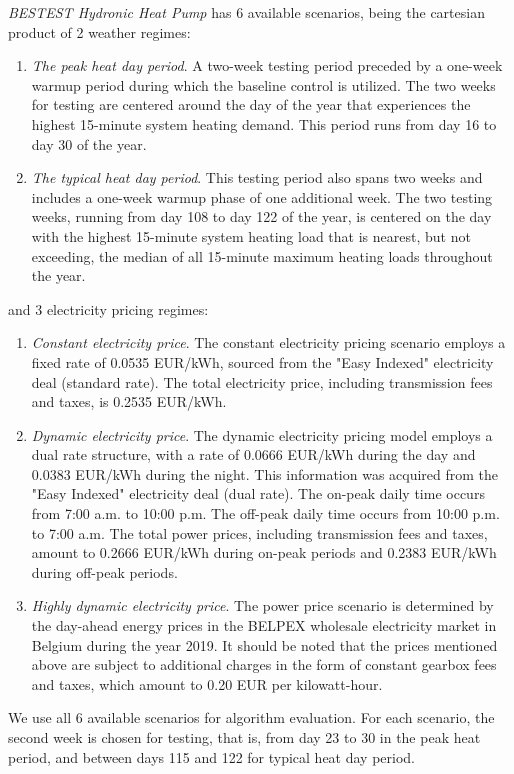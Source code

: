 \emph{BESTEST Hydronic Heat Pump} has 6 available scenarios, being the cartesian product of 2 weather regimes:
\begin{enumerate}
    \item \emph{The peak heat day period}. A two-week testing period preceded by a one-week warmup period during which the baseline control is utilized. The two weeks for testing are centered around the day of the year that experiences the highest 15-minute system heating demand. This period runs from day 16 to day 30 of the year.
    \item \emph{The typical heat day period}. This testing period also spans two weeks and includes a one-week warmup phase of one additional week. The two testing weeks, running from day 108 to day 122 of the year, is centered on the day with the highest 15-minute system heating load that is nearest, but not exceeding, the median of all 15-minute maximum heating loads throughout the year.
\end{enumerate}
and 3 electricity pricing regimes: 
\begin{enumerate}
    \item \emph{Constant electricity price}. The constant electricity pricing scenario employs a fixed rate of 0.0535 EUR/kWh, sourced from the "Easy Indexed" electricity deal (standard rate).  The total electricity price, including transmission fees and taxes, is 0.2535 EUR/kWh.
    \item \emph{Dynamic electricity price}. The dynamic electricity pricing model employs a dual rate structure, with a rate of 0.0666 EUR/kWh during the day and 0.0383 EUR/kWh during the night. This information was acquired from the "Easy Indexed" electricity deal (dual rate).   The on-peak daily time occurs from 7:00 a.m. to 10:00 p.m.   The off-peak daily time occurs from 10:00 p.m. to 7:00 a.m.  The total power prices, including transmission fees and taxes, amount to 0.2666 EUR/kWh during on-peak periods and 0.2383 EUR/kWh during off-peak periods.
    \item \emph{Highly dynamic electricity price}. The power price scenario is determined by the day-ahead energy prices in the BELPEX wholesale electricity market in Belgium during the year 2019.  It should be noted that the prices mentioned above are subject to additional charges in the form of constant gearbox fees and taxes, which amount to 0.20 EUR per kilowatt-hour.
\end{enumerate} 

We use all 6 available scenarios for algorithm evaluation. 
For each scenario, the second week is chosen for testing, that is, from day 23 to 30 in the peak heat period, and between days 115 and 122 for typical heat day period.

